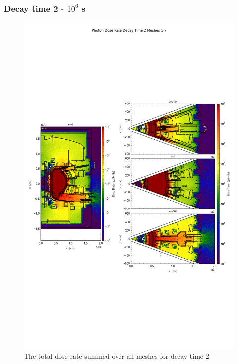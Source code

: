 \documentclass[12pt]{article}
\begin{document}
\subsubsection{Decay time 2 - $10^6$ s}
\begin{figure}[ht!]
\centering
\includegraphics[trim={0cm 9cm 0cm 10cm},clip,scale=0.75]{../plots/final_model/Photon_Dose_Rate_Decay_Time_2_Meshes_1-7.png}
\caption{The total dose rate summed over all meshes for decay time 2}
\label{fig:photons_dc2_no4bc_total}
\end{figure}
\end{document}
